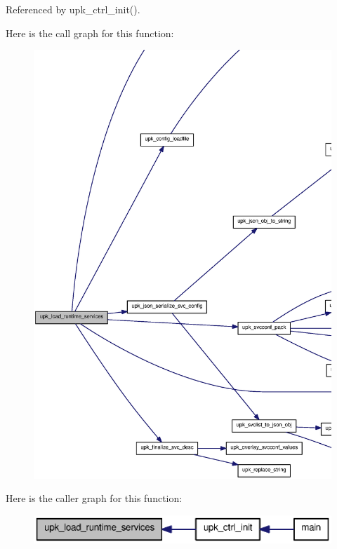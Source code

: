 Referenced by upk\_\-ctrl\_\-init().



Here is the call graph for this function:\nopagebreak
\begin{figure}[H]
\begin{center}
\leavevmode
\includegraphics[width=400pt]{group__functions_gaad96df378fe382df9bb37e2f21b62ee9_cgraph}
\end{center}
\end{figure}




Here is the caller graph for this function:\nopagebreak
\begin{figure}[H]
\begin{center}
\leavevmode
\includegraphics[width=360pt]{group__functions_gaad96df378fe382df9bb37e2f21b62ee9_icgraph}
\end{center}
\end{figure}


